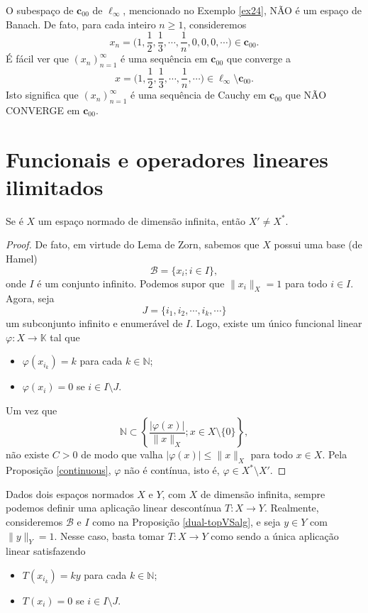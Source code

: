 \begin{example}\label{incompleto}
O subespaço de $\textbf{c}_{00}$ de $\ell_{\infty}$, mencionado no Exemplo \ref{ex24}, NÃO é um espaço de Banach. De fato, para cada inteiro $n \geq 1$, consideremos
\[
\displaystyle x_n =\bigg( 1,\frac{1}{2}, \frac{1}{3}, \cdots , \frac{1}{n}, 0, 0, 0,\cdots \bigg) \in \textbf{c}_{00}.
\]
É fácil ver que $(x_n)_{n=1}^{\infty}$ é uma sequência em $\textbf{c} _{00}$ que converge a 
\[
\displaystyle x =\bigg( 1,\frac{1}{2}, \frac{1}{3}, \cdots , \frac{1}{n}, \cdots \bigg) \in \ell_{\infty} \setminus\textbf{c}_{00}.
\]
Isto significa que $(x_n)_{n=1}^{\infty}$ é uma sequência de Cauchy em $\textbf{c}_{00}$ que NÃO CONVERGE em $\textbf{c}_{00}$.
\end{example}

\section{Funcionais e operadores lineares ilimitados}


\begin{proposition}\label{dual-topVSalg}
Se é $X$ um espaço normado de dimensão infinita, então $X'\neq X^{\ast}$.
\end{proposition}
\begin{proof}
De fato, em virtude do Lema de Zorn, sabemos que $X$ possui uma base (de Hamel)
\[
\displaystyle \mathcal B = \{ x_i; i\in I\},
\]
onde $I$ é um conjunto infinito. Podemos supor que $\| x_i \|_X =1$ para todo $i\in I$. Agora, seja 
\[
\displaystyle J = \{ i_1, i_2, \cdots , i_k, \cdots \}
\]
um subconjunto infinito e enumerável de $I$. Logo, existe um único funcional linear $\varphi : X \longrightarrow \mathbb K$ tal que 
\begin{itemize}
\item $\varphi (x_{i_k})=k$ para cada $k\in \mathbb N$;
\item $\varphi (x_i)=0$ se $i\in I\setminus J$.
\end{itemize}
Um vez que 
\[
\displaystyle \mathbb N \subset \left\{ \frac{|\varphi (x)|}{\|x\|_{X}}; x\in X\setminus \{0\}\right\},
\]
não existe $C>0$ de modo que valha $|\varphi (x)|\leq \|x\|_X$ para todo $x\in X$. Pela Proposição \ref{continuous}, $\varphi$ não é contínua, isto é, $\varphi \in X^{\ast} \setminus X'$.
\end{proof}

\begin{remark}\label{opilimitado}
Dados dois espaços normados $X$ e $Y$, com $X$ de dimensão infinita, sempre podemos definir uma aplicação linear descontínua $T:X\longrightarrow Y$. Realmente, consideremos $\mathcal B$ e $I$ como na Proposição \ref{dual-topVSalg}, e seja $y\in Y$ com $\|y\|_Y =1$. Nesse caso, basta tomar $T:X\longrightarrow Y$ como sendo a única aplicação linear satisfazendo
\begin{itemize}
\item $T(x_{i_k})=ky$ para cada $k\in \mathbb N$;
\item $T(x_i)=0$ se $i\in I\setminus J$.
\end{itemize}
\end{remark}
 
